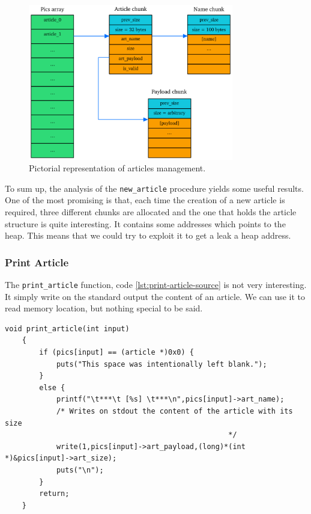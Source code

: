 \documentclass{article}
\numberwithin{equation}{subsection}
\begin{document}
\begin{figure}[H]
    \centering
    \includegraphics[width=0.8\textwidth]{article_management_structure.pdf}
    \caption{Pictorial representation of articles management.}
    \label{fig:article_management_structure}
\end{figure}
\noindent
To sum up, the analysis of the \texttt{new\_article} procedure yields some useful results. One of the most promising is that, each time the creation of a new article is required, three different chunks are allocated and the one that holds the article structure is quite interesting. It contains some addresses which points to the heap. This means that we could try to exploit it to get a leak a heap address.
\clearpage
\subsubsection{Print Article}
The \texttt{print\_article} function, code \ref{lst:print-article-source} is not very interesting. It simply write on the standard output the content of an article. We can use it to read memory location, but nothing special to be said.\newline
\noindent
\begin{minipage}{\textwidth}
\centering
\lstset{style=cstyle}
\begin{lstlisting}[caption={Print\_article routine of asciigal source code.},captionpos=b,label={lst:print-article-source}]
    void print_article(int input)
    {
    	if (pics[input] == (article *)0x0) {
    		puts("This space was intentionally left blank.");
    	}
    	else {
    		printf("\t***\t [%s] \t***\n",pics[input]->art_name);
    		/* Writes on stdout the content of the article with its size
    												*/
    		write(1,pics[input]->art_payload,(long)*(int *)&pics[input]->art_size);
    		puts("\n");
    	}
    	return;
    }
\end{lstlisting}
\end{minipage}
\end{document}
